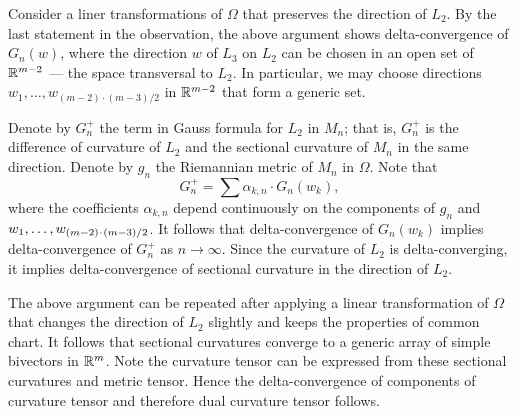 Consider a liner transformations of $\Omega$ that preserves the direction of $L_2$.
By the last statement in the observation,
the above argument shows delta-convergence of $G_n(w)$, where the direction $w$ of $L_3$ on $L_2$ can be chosen in an open set of $\mathbb{R}^{m-2}$ --- the space transversal to $L_2$.
In particular, we may choose directions $w_1,\dots, w_{(m-2)\cdot(m-3)/2}$ in $\mathbb{R}^{m-2}$ that form a generic set.

Denote by $G_n^+$ the term in Gauss formula for $L_2$ in $M_n$;
that is, $G_n^+$ is the difference of curvature of $L_2$ and the sectional curvature of $M_n$ in the same direction.
Denote by $g_n$ the Riemannian metric of $M_n$ in $\Omega$.
Note that 
\[G_n^+=\sum\alpha_{k,n}\cdot G_n(w_k),\]
where the coefficients $\alpha_{k,n}$ depend continuously on the components of $g_n$ and $w_1,\zz\dots, w_{(m-2)\cdot(m-3)/2}$. 
It follows that delta-convergence of $G_n(w_k)$ implies delta-convergence of $G_n^+$ as $n\to\infty$.
Since the curvature of $L_2$ is delta-converging, it implies delta-convergence of sectional curvature in the direction of $L_2$.

The above argument can be repeated after applying a linear transformation of $\Omega$ that changes the direction of $L_2$ slightly and keeps the properties of common chart.
It follows that sectional curvatures converge to a generic array of simple bivectors in $\mathbb{R}^m$.
Note the curvature tensor can be expressed from these sectional curvatures and metric tensor.
Hence the delta-convergence of components of curvature tensor and therefore dual curvature tensor follows.
\qeds

